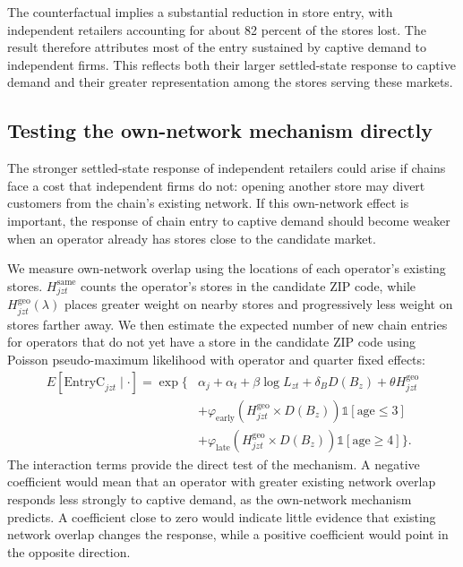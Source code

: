 \documentclass[english,12pt]{article}
\begin{document}
The counterfactual implies a substantial reduction in store entry, with independent retailers accounting for about 82 percent of the stores lost. The result therefore attributes most of the entry sustained by captive demand to independent firms. This reflects both their larger settled-state response to captive demand and their greater representation among the stores serving these markets.

\subsection{Testing the own-network mechanism directly}
\label{sec:mechreg}

The stronger settled-state response of independent retailers could arise if chains face a cost that independent firms do not: opening another store may divert customers from the chain's existing network. If this own-network effect is important, the response of chain entry to captive demand should become weaker when an operator already has stores close to the candidate market.

We measure own-network overlap using the locations of each operator's existing stores. $H^{\text{same}}_{jzt}$ counts the operator's stores in the candidate ZIP code, while $H^{\text{geo}}_{jzt}(\lambda)$ places greater weight on nearby stores and progressively less weight on stores farther away. We then estimate the expected number of new chain entries for operators that do not yet have a store in the candidate ZIP code using Poisson pseudo-maximum likelihood with operator and quarter fixed effects:
\begin{equation*}
\begin{aligned}
E[\text{EntryC}_{jzt}\mid\cdot]
=
\exp\Big\{&
\alpha_j+\alpha_t+\beta\log L_{zt}
+\delta_B D(B_z)
+\theta H^{\text{geo}}_{jzt}\\
&+\varphi_{\text{early}}
\left(H^{\text{geo}}_{jzt}\times D(B_z)\right)
\mathbb{1}[\text{age}\le3]\\
&+\varphi_{\text{late}}
\left(H^{\text{geo}}_{jzt}\times D(B_z)\right)
\mathbb{1}[\text{age}\ge4]
\Big\}.
\end{aligned}
\end{equation*}
The interaction terms provide the direct test of the mechanism. A negative coefficient would mean that an operator with greater existing network overlap responds less strongly to captive demand, as the own-network mechanism predicts. A coefficient close to zero would indicate little evidence that existing network overlap changes the response, while a positive coefficient would point in the opposite direction.
\end{document}

